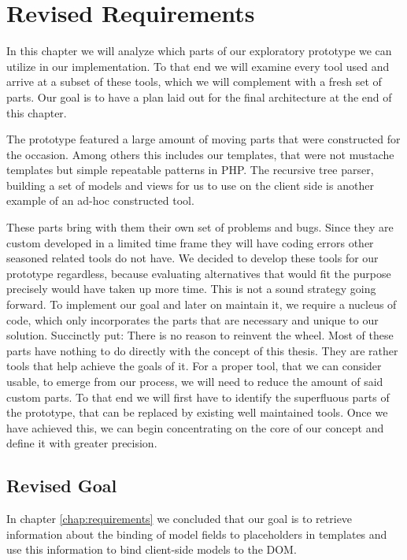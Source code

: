 \documentclass[thesis.tex]{subfiles}
\begin{document}
\chapter{Revised Requirements}
\label{chap:revised}
In this chapter we will analyze which parts of our exploratory prototype we can
utilize in our implementation. To that end we will examine every tool used and
arrive at a subset of these tools, which we will complement with a fresh set of
parts. Our goal is to have a plan laid out for the final architecture at the end
of this chapter.

The prototype featured a large amount of moving parts that were constructed for
the occasion. Among others this includes our templates, that were not mustache
templates but simple repeatable patterns in PHP. The recursive tree parser,
building a set of models and views for us to use on the client side is another
example of an ad-hoc constructed tool.

These parts bring with them their own set of problems and bugs.
Since they are custom developed in a limited time frame they will have coding
errors other seasoned related tools do not have.
We decided to develop these tools for our prototype regardless,
because evaluating alternatives that would fit the purpose precisely
would have taken up more time.
This is not a sound strategy going forward. To implement our goal and later on
maintain it, we require a nucleus of code, which only incorporates the parts
that are necessary and unique to our solution.
Succinctly put: There is no reason to reinvent the wheel.
Most of these parts have nothing to do directly with the concept of this thesis.
They are rather tools that help achieve the goals of it.
For a proper tool, that we can consider usable, to emerge from our process,
we will need to reduce the amount of said custom parts.
To that end we will first have to identify the superfluous parts of the
prototype, that can be replaced by existing well maintained tools. Once we have
achieved this, we can begin concentrating on the core of our concept and define
it with greater precision.

\section{Revised Goal}
\label{sec:revised-goal}
In chapter \ref{chap:requirements} we concluded that our goal is to retrieve
information about the binding of model fields to placeholders in templates and
use this information to bind client-side models to the DOM.
\end{document}

